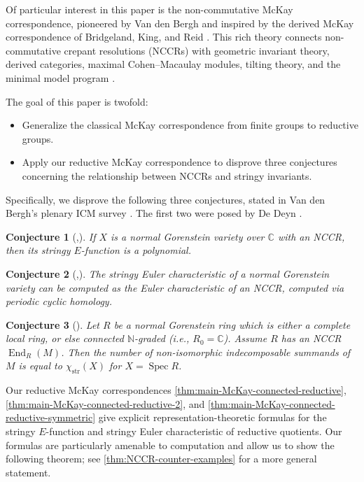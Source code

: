 \documentclass[12pt,a4paper]{amsart}
\newtheorem{conjecture}[conjecture]{Conjecture}
\theoremstyle{definition}
\newcommand{\NN}{\mathbb{N}}
\newcommand{\CC}{\mathbb{C}}
\newcommand{\str}{\mathrm{str}}
\renewcommand{\1}{\textbf{1}}
\newcommand{\<}{\langle}
\renewcommand{\>}{\rangle}
\DeclareMathOperator{\Spec}{Spec}
\DeclareMathOperator{\End}{End}
\begin{document}
Of particular interest in this paper is the non-commutative McKay correspondence, pioneered by Van den Bergh \cite{vdB2004} and inspired by the derived McKay correspondence of Bridgeland, King, and Reid \cite{BKR}. This rich theory connects non-commutative crepant resolutions (NCCRs) with geometric invariant theory, derived categories, maximal Cohen--Macaulay modules, tilting theory, and the minimal model program \cite{vdB10,IW13,SpenkoVanDenBergh17,vanDenBerghICM}.

The goal of this paper is twofold:
\begin{itemize}
\item Generalize the classical McKay correspondence from finite groups to reductive groups.
\item Apply our reductive McKay correspondence to disprove three conjectures concerning the relationship between NCCRs and stringy invariants.
\end{itemize}

Specifically, we disprove the following three conjectures, stated in Van den Bergh's plenary ICM survey \cite{vanDenBerghICM}. The first two were posed by De Deyn \cite{DeDeyn2023}.


\begin{conjecture}[{\cite[Conjecture 5.3]{vanDenBerghICM},\cite[Question 4.3]{DeDeyn2023}}]\label{conj:main1}
If $X$ is a normal Gorenstein variety over $\CC$ with an NCCR, then its stringy $E$-function is a polynomial.
\end{conjecture}

\begin{conjecture}[{\cite[Conjecture 5.12]{vanDenBerghICM},\cite[Question 4.11]{DeDeyn2023}}]\label{conj:main2}
The stringy Euler characteristic of a normal Gorenstein variety can be computed as the Euler characteristic of an NCCR, computed via periodic cyclic homology.
\end{conjecture}

\begin{conjecture}[{\cite[Conjecture 5.14]{vanDenBerghICM}}]\label{conj:main3}
Let $R$ be a normal Gorenstein ring which is either a complete local ring, or else connected $\NN$-graded (i.e., $R_0=\CC$). Assume $R$ has an NCCR $\End_R(M)$. Then the number of non-isomorphic indecomposable summands of $M$ is equal to $\chi_{\str}(X)$ for $X=\Spec R$.
\end{conjecture}

Our reductive McKay correspondences \autoref{thm:main-McKay-connected-reductive}, \autoref{thm:main-McKay-connected-reductive-2}, and \autoref{thm:main-McKay-connected-reductive-symmetric} give explicit representation-theoretic formulas for the stringy $E$-function and stringy Euler characteristic of reductive quotients. Our formulas are particularly amenable to computation and allow us to show the following theorem; see \autoref{thm:NCCR-counter-examples} for a more general statement.
\end{document}
